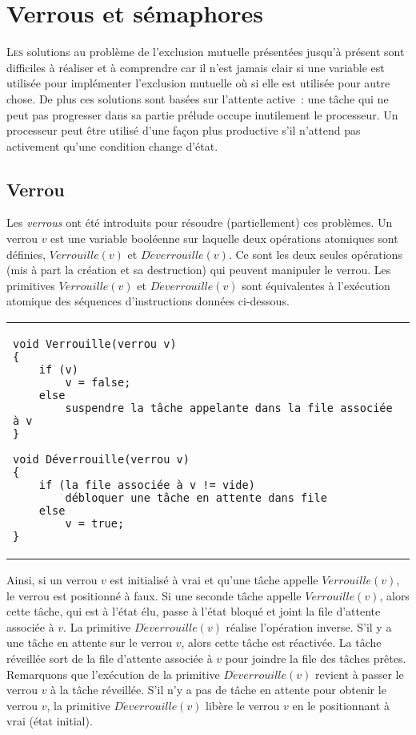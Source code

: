 \chapter{Verrous et sémaphores}
\startchapter

\lettrine[lines=4]{L}{es} solutions au problème de l'exclusion mutuelle présentées jusqu'à présent sont difficiles à réaliser et à comprendre car il n'est jamais clair si une variable est utilisée pour implémenter l'exclusion mutuelle où si elle est utilisée pour autre chose.
De plus ces solutions sont basées sur l'attente active~:  une tâche qui ne peut pas progresser dans sa partie prélude occupe inutilement le processeur.  Un processeur peut être utilisé d'une façon plus productive s'il n'attend pas activement qu'une condition change d'état.

\section{Verrou}\label{verrou:intro}
Les {\em verrous} ont été introduits pour résoudre (partiellement) ces problèmes. Un verrou $v$ est une variable booléenne sur laquelle deux opérations atomiques sont définies, $Verrouille(v)$ et $D\acute{e}verrouille(v)$.  Ce sont les deux seules opérations (mis à part la création et sa destruction) qui peuvent manipuler le verrou.
Les primitives $Verrouille(v)$ et $D\acute{e}verrouille(v)$ sont équivalentes à l'exécution atomique des séquences d'instructions données ci-dessous.

\begin{center}
\begin{tabular}{l}
\lstset{language=C++}
\begin{lstlisting}
void Verrouille(verrou v)
{
	if (v)
		v = false;
	else
		suspendre la tâche appelante dans la file associée à v
}

void Déverrouille(verrou v)
{
	if (la file associée à v != vide)
		débloquer une tâche en attente dans file
	else
		v = true;
}
\end{lstlisting}
\end{tabular}
\end{center}
\par
Ainsi, si un verrou $v$ est initialisé à vrai et qu'une tâche appelle $Verrouille(v)$, le verrou est positionné à faux. Si une seconde tâche appelle $Verrouille(v)$, alors cette tâche, qui est à l'état élu, passe à l'état bloqué et joint la file d'attente associée à $v$.
La primitive $D\acute{e}verrouille(v)$ réalise l'opération inverse. S'il y a une tâche en attente sur le verrou $v$, alors cette tâche est réactivée. La tâche réveillée sort de la file d'attente associée à $v$ pour joindre la file des tâches prêtes. Remarquons que l'exécution de la primitive $D\acute{e}verrouille(v)$ revient à passer le verrou $v$ à la tâche réveillée.
S'il n'y a pas de tâche en attente pour obtenir le verrou $v$, la primitive $D\acute{e}verrouille(v)$ libère le verrou $v$ en le positionnant à vrai (état initial).

